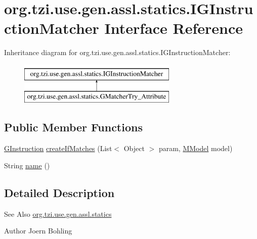 \hypertarget{interfaceorg_1_1tzi_1_1use_1_1gen_1_1assl_1_1statics_1_1_i_g_instruction_matcher}{\section{org.\-tzi.\-use.\-gen.\-assl.\-statics.\-I\-G\-Instruction\-Matcher Interface Reference}
\label{interfaceorg_1_1tzi_1_1use_1_1gen_1_1assl_1_1statics_1_1_i_g_instruction_matcher}
}
Inheritance diagram for org.\-tzi.\-use.\-gen.\-assl.\-statics.\-I\-G\-Instruction\-Matcher\-:\begin{figure}[H]
\begin{center}
\leavevmode
\includegraphics[height=2.000000cm]{interfaceorg_1_1tzi_1_1use_1_1gen_1_1assl_1_1statics_1_1_i_g_instruction_matcher}
\end{center}
\end{figure}
\subsection*{Public Member Functions}
\begin{DoxyCompactItemize}
\item 
\hyperlink{interfaceorg_1_1tzi_1_1use_1_1gen_1_1assl_1_1statics_1_1_g_instruction}{G\-Instruction} \hyperlink{interfaceorg_1_1tzi_1_1use_1_1gen_1_1assl_1_1statics_1_1_i_g_instruction_matcher_ac82e550f03abb5ab7d2112c6b1830896}{create\-If\-Matches} (List$<$ Object $>$ param, \hyperlink{classorg_1_1tzi_1_1use_1_1uml_1_1mm_1_1_m_model}{M\-Model} model)
\item 
String \hyperlink{interfaceorg_1_1tzi_1_1use_1_1gen_1_1assl_1_1statics_1_1_i_g_instruction_matcher_a2176104f4d4d81361ed45461948e0401}{name} ()
\end{DoxyCompactItemize}


\subsection{Detailed Description}
\begin{DoxySeeAlso}{See Also}
\hyperlink{namespaceorg_1_1tzi_1_1use_1_1gen_1_1assl_1_1statics}{org.\-tzi.\-use.\-gen.\-assl.\-statics} 
\end{DoxySeeAlso}
\begin{DoxyAuthor}{Author}
Joern Bohling 
\end{DoxyAuthor}



